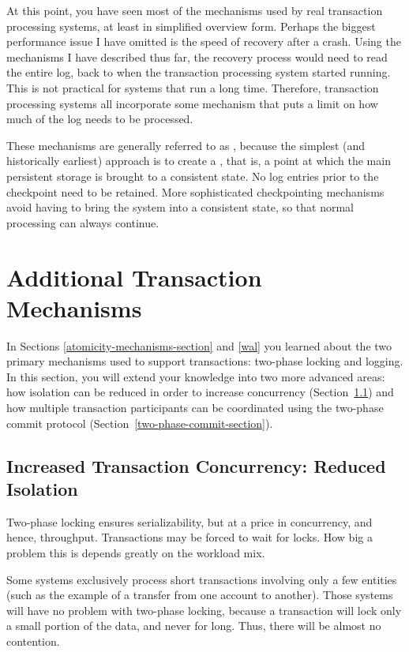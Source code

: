 At this point, you have seen most of the mechanisms used by real
transaction processing systems, at least in simplified overview form.
Perhaps the biggest performance issue I have omitted is the speed of
recovery after a crash.  Using the mechanisms I have described thus
far, the recovery process would need to read the entire log, back to
when the transaction processing system started running.  This is
not practical for systems that run a long time.  Therefore,
transaction processing systems all incorporate some 
mechanism that puts a limit on how much of the log
needs to be processed.

These mechanisms are generally referred to as ,
because the simplest (and historically earliest) approach is to
create a , that is, a point at which the main
persistent storage is brought to a consistent state.  No log entries
prior to the checkpoint need to be retained.  More sophisticated
checkpointing mechanisms avoid having to bring the system into a
consistent state, so that normal processing can always continue.

\section{Additional Transaction Mechanisms}\label{additional-transaction-mechanisms-section}

In Sections \ref{atomicity-mechanisms-section} and \ref{wal} you learned about the
two primary mechanisms used to support transactions: two-phase locking
and logging.  In this section, you will extend your knowledge into
two more advanced areas: how isolation can be reduced in order to
increase concurrency (Section~\ref{reduced-isolation}) and
how multiple transaction participants can be coordinated using the
two-phase commit protocol (Section~\ref{two-phase-commit-section}).

\subsection{Increased Transaction Concurrency: Reduced Isolation}\label{reduced-isolation}

Two-phase locking ensures serializability, but at a price in
concurrency, and hence, throughput.  Transactions may be forced to wait
for locks.  How big a problem this is depends greatly on the workload
mix.

Some systems exclusively process short transactions involving only a
few entities (such as the example of a transfer from one account to
another).  Those systems will have no problem with two-phase locking,
because a transaction will lock only a small portion of the data, and
never for long.  Thus, there will be almost no contention.

